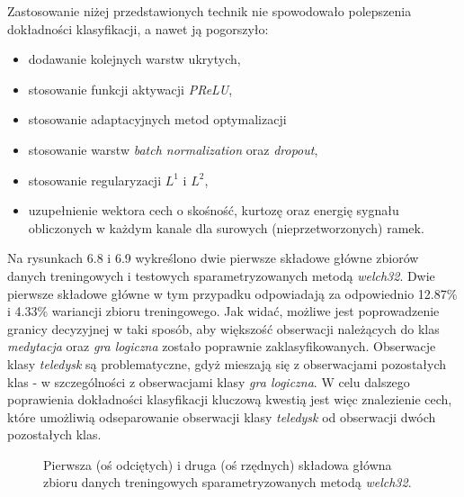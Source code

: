 \documentclass[notitlepage]{report}
\begin{document}
Zastosowanie niżej przedstawionych technik nie spowodowało polepszenia dokładności klasyfikacji, a nawet ją pogorszyło:
\begin{itemize}
	\item dodawanie kolejnych warstw ukrytych,
	\item stosowanie funkcji aktywacji \textit{PReLU},
	\item stosowanie adaptacyjnych metod optymalizacji
	\item stosowanie warstw \textit{batch normalization} oraz \textit{dropout},
	\item stosowanie regularyzacji $L^1$ i $L^2$,
	\item uzupełnienie wektora cech o skośność, kurtozę oraz energię sygnału obliczonych w każdym kanale dla surowych (nieprzetworzonych) ramek.
\end{itemize}

Na rysunkach 6.8 i 6.9 wykreślono dwie pierwsze składowe główne zbiorów danych treningowych i testowych sparametryzowanych metodą \textit{welch32}. Dwie pierwsze składowe główne w tym przypadku odpowiadają za odpowiednio 12.87\% i 4.33\% wariancji zbioru treningowego. Jak widać, możliwe jest poprowadzenie granicy decyzyjnej w taki sposób, aby większość obserwacji należących do klas \textit{medytacja} oraz \textit{gra logiczna} zostało poprawnie zaklasyfikowanych. Obserwacje klasy \textit{teledysk} są problematyczne, gdyż mieszają się z obserwacjami pozostałych klas - w szczególności z obserwacjami klasy \textit{gra logiczna}. W celu dalszego poprawienia dokładności klasyfikacji kluczową kwestią jest więc znalezienie cech, które umożliwią odseparowanie obserwacji klasy \textit{teledysk} od obserwacji dwóch pozostałych klas.

\begin{figure}[H]
	\centering
	\caption{Pierwsza (oś odciętych) i druga (oś rzędnych) składowa główna zbioru danych treningowych sparametryzowanych metodą \textit{welch32}.}
\end{figure}
\end{document}
